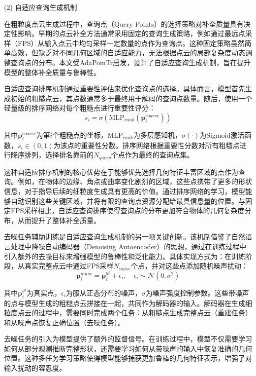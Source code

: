 (2) 自适应查询生成机制

在粗粒度点云生成过程中，查询点（Query Points）的选择策略对补全质量具有决定性影响。早期的点云补全方法通常采用固定的查询生成策略，例如通过最远点采样（FPS）从输入点云中均匀采样一定数量的点作为查询点。这种固定策略虽然简单高效，但缺乏对不同几何区域的自适应能力，无法根据点云的局部复杂度动态调整查询点的分布。本文受AdaPoinTr\cite{yu2023adapointr}启发，设计了自适应查询生成机制，旨在提升模型的整体补全质量与鲁棒性。

自适应查询排序机制通过重要性评估来优化查询点的选择。具体而言，模型首先生成初始的粗糙点云，其点数通常多于最终用于解码的查询点数量。随后，使用一个轻量级的排序网络对每个粗糙点进行重要性评分：
\begin{equation}
s_i = \sigma(\text{MLP}_{rank}(\mathbf{p}_i^{coarse}))
\end{equation}

其中$\mathbf{p}_i^{coarse}$为第$i$个粗糙点的坐标，$\text{MLP}_{rank}$为多层感知机，$\sigma(\cdot)$为Sigmoid激活函数，$s_i \in (0, 1)$为该点的重要性分数。排序网络根据重要性分数对所有粗糙点进行降序排列，选择排名靠前的$N_{query}$个点作为最终的查询点集。

这种自适应排序机制的核心优势在于能够优先选择几何特征丰富区域的点作为查询。例如，在物体的边缘、角点或曲率变化剧烈的区域，这些点携带了更多的形状信息，对于指导后续的细粒度生成具有更高的价值。通过排序网络的学习，模型能够自动识别这些关键区域，并将有限的查询点资源分配给最具信息量的位置。与固定FPS采样相比，自适应查询排序使得查询点的分布更加符合物体的几何复杂度分布，从而提升了整体补全质量。

去噪任务辅助训练是自适应查询生成机制的另一项关键创新。该机制借鉴了自然语言处理中降噪自动编码器（Denoising Autoencoder）的思想，通过在训练过程中引入额外的去噪目标来增强模型的鲁棒性和泛化能力。具体实现方式为：在训练阶段，从真实完整点云中通过FPS采样$N_{noise}$个点，并对这些点添加随机噪声扰动：
\begin{equation}
\mathbf{p}_i^{noise} = \mathbf{p}_i^{gt} + \epsilon_i, \quad \epsilon_i \sim \mathcal{N}(0, \sigma^2)
\end{equation}

其中$\mathbf{p}_i^{gt}$为真实点，$\epsilon_i$为服从正态分布的噪声，$\sigma$为噪声强度控制参数。这些带噪声的点与模型生成的粗糙点云拼接在一起，共同作为解码器的输入。解码器在生成细粒度点云的过程中，需要同时完成两个任务：从粗糙点生成完整点云（重建任务）和从噪声点恢复正确位置（去噪任务）。

去噪任务的引入为模型提供了额外的监督信号。在训练过程中，模型不仅需要学习如何从部分观测推断完整形状，还需要学习如何从带噪声的输入中恢复准确的几何位置。这种多任务学习策略使得模型能够捕获更加鲁棒的几何特征表示，增强了对输入扰动的容忍度。

